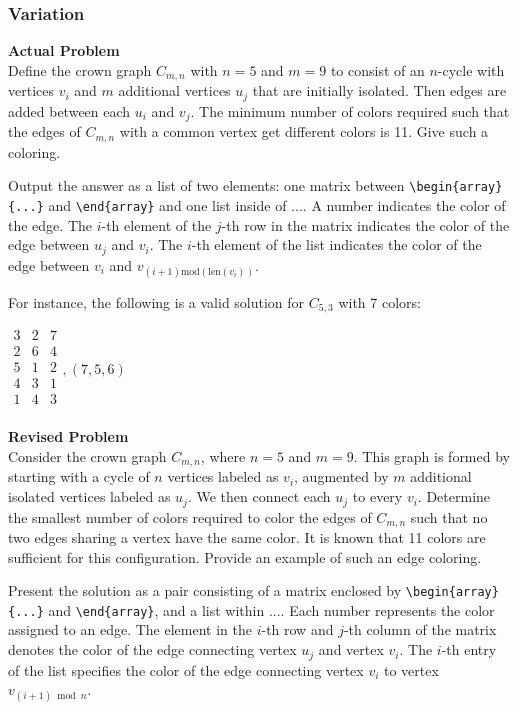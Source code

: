\subsubsection{Variation}
\textbf{Actual Problem}\\
Define the crown graph $C_{m, n}$ with $n = 5$ and $m = 9$ to consist of an $n$-cycle with vertices $v_i$ and $m$ additional vertices $u_j$ that are initially isolated. Then edges are added between each $u_i$ and $v_j$. The minimum number of colors required such that the edges of $C_{m, n}$ with a common vertex get different colors is 11. Give such a coloring.

Output the answer as a list of two elements: one matrix between \verb|\begin{array}{...}| and \verb|\end{array}| and one list inside of $\boxed{...}$. A number indicates the color of the edge. The $i$-th element of the $j$-th row in the matrix indicates the color of the edge between $u_j$ and $v_i$. The $i$-th element of the list indicates the color of the edge between $v_i$ and $v_{(i+1) \text{mod}(\text{len}(v_i))}$.

For instance, the following is a valid solution for $C_{{5, 3}}$ with 7 colors:

$\boxed{
\begin{array}{ccc}
3 & 2 & 7 \\
2 & 6 & 4 \\
5 & 1 & 2 \\
4 & 3 & 1 \\
1 & 4 & 3 \\
\end{array},
(7, 5, 6)
}$



\textbf{Revised Problem}\\
Consider the crown graph $C_{m, n}$, where $n = 5$ and $m = 9$. This graph is formed by starting with a cycle of $n$ vertices labeled as $v_i$, augmented by $m$ additional isolated vertices labeled as $u_j$. We then connect each $u_j$ to every $v_i$. Determine the smallest number of colors required to color the edges of $C_{m, n}$ such that no two edges sharing a vertex have the same color. It is known that 11 colors are sufficient for this configuration. Provide an example of such an edge coloring.

Present the solution as a pair consisting of a matrix enclosed by \verb|\begin{array}{...}| and \verb|\end{array}|, and a list within $\boxed{...}$. Each number represents the color assigned to an edge. The element in the $i$-th row and $j$-th column of the matrix denotes the color of the edge connecting vertex $u_j$ and vertex $v_i$. The $i$-th entry of the list specifies the color of the edge connecting vertex $v_i$ to vertex $v_{(i+1) \bmod n}$.

